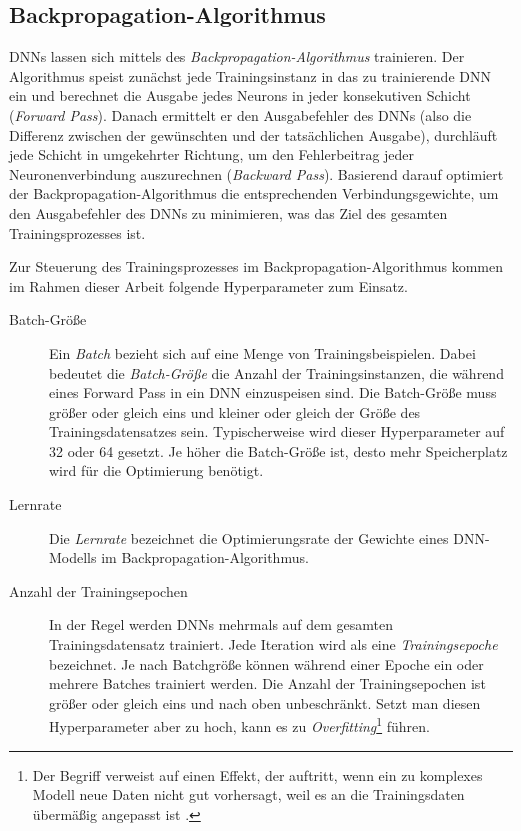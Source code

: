\subsection{Backpropagation-Algorithmus}

DNNs lassen sich mittels des \emph{Backpropagation-Algorithmus} \cite{backpropapaper,Goodfellow-et-al-2016} trainieren. Der Algorithmus speist zunächst jede Trainingsinstanz in das zu trainierende DNN ein und berechnet die Ausgabe jedes Neurons in jeder konsekutiven Schicht (\emph{Forward Pass}). Danach ermittelt er den Ausgabefehler des DNNs (also die Differenz zwischen der gewünschten und der tatsächlichen Ausgabe), durchläuft jede Schicht in umgekehrter Richtung, um den Fehlerbeitrag jeder Neuronenverbindung auszurechnen (\emph{Backward Pass}). Basierend darauf optimiert der Backpropagation-Algorithmus die entsprechenden Verbindungsgewichte, um den Ausgabefehler des DNNs zu minimieren, was das Ziel des gesamten Trainingsprozesses ist.

Zur Steuerung des Trainingsprozesses im Backpropagation-Algorithmus kommen im Rahmen dieser Arbeit folgende Hyperparameter zum Einsatz.

\begin{description}
	\item[Batch-Größe] 
	Ein \emph{Batch} bezieht sich auf eine Menge von Trainingsbeispielen. Dabei bedeutet die \emph{Batch-Größe} die Anzahl der Trainingsinstanzen, die während eines Forward Pass in ein DNN einzuspeisen sind. Die Batch-Größe muss größer oder gleich eins und kleiner oder gleich der Größe des Trainingsdatensatzes sein. Typischerweise wird dieser Hyperparameter auf 32 oder 64 gesetzt. Je höher die Batch-Größe ist, desto mehr Speicherplatz wird für die Optimierung benötigt.
	
	\item[Lernrate] 
	
	Die \emph{Lernrate} bezeichnet die Optimierungsrate der Gewichte eines DNN-Modells im Backpropagation-Algorithmus.
	
	\item[Anzahl der Trainingsepochen]
	
	In der Regel werden DNNs mehrmals auf dem gesamten Trainingsdatensatz trainiert. Jede Iteration wird als eine \emph{Trainingsepoche} bezeichnet. Je nach Batchgröße können während einer Epoche ein oder mehrere Batches trainiert werden. Die Anzahl der Trainingsepochen ist größer oder gleich eins und nach oben unbeschränkt. Setzt man diesen Hyperparameter aber zu hoch, kann es zu \emph{Overfitting}\footnote{Der Begriff verweist auf einen Effekt, der auftritt, wenn ein zu komplexes Modell neue Daten nicht gut vorhersagt, weil es an die Trainingsdaten übermäßig angepasst ist \cite{Novustat}.} führen.
	
	
	 
\end{description}

